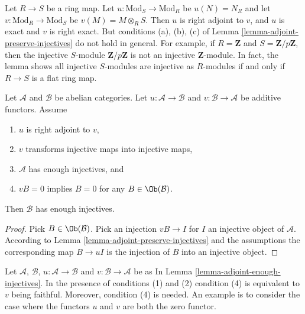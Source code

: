 \begin{remark}
\label{remark-need-left-exactness}
Let $R \to S$ be a ring map. Let $u : \text{Mod}_S \to \text{Mod}_R$
be $u(N) = N_R$ and let $v : \text{Mod}_R \to \text{Mod}_S$ be
$v(M) = M \otimes_R S$. Then $u$ is right adjoint to $v$, and $u$ is
exact and $v$ is right exact. But conditions (a), (b), (c) of
Lemma \ref{lemma-adjoint-preserve-injectives} do not hold in general.
For example, if $R = \mathbf{Z}$ and $S = \mathbf{Z}/p\mathbf{Z}$, then
the injective $S$-module $\mathbf{Z}/p\mathbf{Z}$ is not
an injective $\mathbf{Z}$-module. In fact, the lemma shows
all injective $S$-modules are injective as $R$-modules if and only
if $R \to S$ is a flat ring map.
\end{remark}

\begin{lemma}
\label{lemma-adjoint-enough-injectives}
Let $\mathcal{A}$ and $\mathcal{B}$ be abelian categories.
Let $u : \mathcal{A} \to \mathcal{B}$ and
$v : \mathcal{B} \to \mathcal{A}$ be additive functors.
Assume
\begin{enumerate}
\item $u$ is right adjoint to $v$,
\item $v$ transforms injective maps into injective maps,
\item $\mathcal{A}$ has enough injectives, and
\item $vB = 0$ implies $B = 0$ for any $B \in \Ob(\mathcal{B})$.
\end{enumerate}
Then $\mathcal{B}$ has enough injectives.
\end{lemma}

\begin{proof}
Pick $B \in \Ob(\mathcal{B})$.
Pick an injection $vB \to I$ for $I$
an injective object of $\mathcal{A}$.
According to Lemma \ref{lemma-adjoint-preserve-injectives}
and the assumptions the corresponding map
$B \to uI$ is the injection of $B$ into an injective object.
\end{proof}

\begin{remark}
\label{remark-faithfulness-needed}
Let $\mathcal{A}$, $\mathcal{B}$, $u : \mathcal{A} \to \mathcal{B}$ and
$v : \mathcal{B} \to \mathcal{A}$ be as
In Lemma \ref{lemma-adjoint-enough-injectives}.
In the presence of conditions (1) and (2) condition (4) is equivalent
to $v$ being faithful. Moreover, condition (4) is needed.
An example is to consider the
case where the functors $u$ and $v$ are both the zero functor.
\end{remark}

